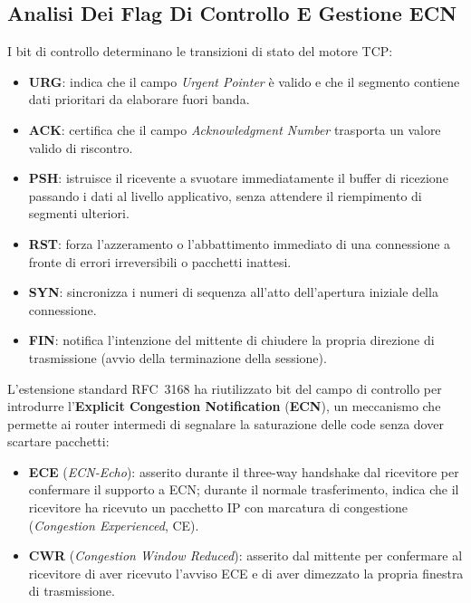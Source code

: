 \documentclass[11pt, a4paper]{article}
\begin{document}
\subsection{Analisi Dei Flag Di Controllo E Gestione ECN}

I bit di controllo determinano le transizioni di stato del motore TCP:
\begin{itemize}
    \item \textbf{URG}: indica che il campo \emph{Urgent Pointer} è valido e che il segmento contiene dati prioritari da elaborare fuori banda.
    \item \textbf{ACK}: certifica che il campo \emph{Acknowledgment Number} trasporta un valore valido di riscontro.
    \item \textbf{PSH}: istruisce il ricevente a svuotare immediatamente il buffer di ricezione passando i dati al livello applicativo, senza attendere il riempimento di segmenti ulteriori.
    \item \textbf{RST}: forza l'azzeramento o l'abbattimento immediato di una connessione a fronte di errori irreversibili o pacchetti inattesi.
    \item \textbf{SYN}: sincronizza i numeri di sequenza all'atto dell'apertura iniziale della connessione.
    \item \textbf{FIN}: notifica l'intenzione del mittente di chiudere la propria direzione di trasmissione (avvio della terminazione della sessione).
\end{itemize}


L'estensione standard RFC~3168 ha riutilizzato bit del campo di controllo per introdurre l'\textbf{Explicit Congestion Notification} (\textbf{ECN}), un meccanismo che permette ai router intermedi di segnalare la saturazione delle code senza dover scartare pacchetti:
\begin{itemize}
    \item \textbf{ECE} (\emph{ECN-Echo}): asserito durante il three-way handshake dal ricevitore per confermare il supporto a ECN; durante il normale trasferimento, indica che il ricevitore ha ricevuto un pacchetto IP con marcatura di congestione (\emph{Congestion Experienced}, CE).
    \item \textbf{CWR} (\emph{Congestion Window Reduced}): asserito dal mittente per confermare al ricevitore di aver ricevuto l'avviso ECE e di aver dimezzato la propria finestra di trasmissione.
\end{itemize}
\end{document}

